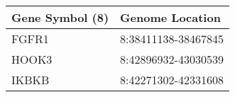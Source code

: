 \begin{tabular}{ll}
\toprule
Gene Symbol (8) &     Genome Location \\
\midrule
          FGFR1 & 8:38411138-38467845 \\
          HOOK3 & 8:42896932-43030539 \\
          IKBKB & 8:42271302-42331608 \\
\bottomrule
\end{tabular}
